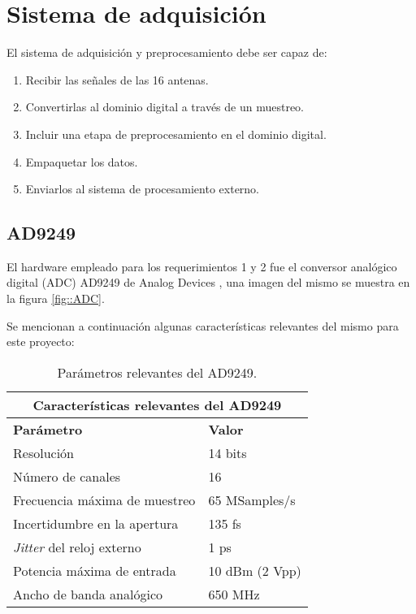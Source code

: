 \documentclass[../../main.tex]{subfiles}
\begin{document}

\section{Sistema de adquisición} \label{sec::planteo-sist-adq}
El sistema de adquisición y preprocesamiento debe ser capaz de:
\begin{enumerate}
    \item Recibir las señales de las 16 antenas.
    \item Convertirlas al dominio digital a través de un muestreo.
    \item Incluir una etapa de preprocesamiento en el dominio digital.
    \item Empaquetar los datos.
    \item Enviarlos al sistema de procesamiento externo.
\end{enumerate}

\subsection{AD9249}
El hardware empleado para los requerimientos 1 y 2 fue el conversor analógico digital (ADC) AD9249 de Analog Devices \cite{AD9249}, una imagen del mismo se muestra en la figura \ref{fig::ADC}.

Se mencionan a continuación algunas características relevantes del mismo para este proyecto:
\begin{table}[H]
    \centering
    \begin{tabular}{|ll|}
    \hline
    \multicolumn{2}{|c|}{\textbf{Características relevantes del AD9249}}                      \\ \hline
    \multicolumn{1}{|l|}{\textbf{Parámetro}}                                          & \textbf{Valor}          \\ \hline
    \multicolumn{1}{|l|}{Resolución}                                         & 14 bits        \\ \hline
    \multicolumn{1}{|l|}{Número de canales}                                  & 16             \\ \hline
    \multicolumn{1}{|l|}{Frecuencia máxima de muestreo}                      & 65 MSamples/s  \\ \hline
    \multicolumn{1}{|l|}{Incertidumbre en la apertura}                       & 135 fs         \\ \hline
    \multicolumn{1}{|l|}{\textit{Jitter} del reloj externo} & 1 ps           \\ \hline
    \multicolumn{1}{|l|}{Potencia máxima de entrada}                         & 10 dBm (2 Vpp) \\ \hline
    \multicolumn{1}{|l|}{Ancho de banda analógico}                           & 650 MHz        \\ \hline
    \end{tabular}
    \caption{Parámetros relevantes del AD9249.}
    \label{tab::ADC}
\end{table}
\end{document}
